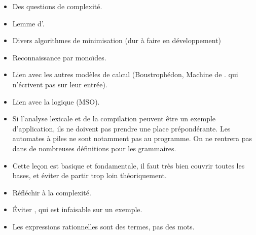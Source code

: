 \documentclass{agregfiche}
\begin{document}
\secidees
\begin{itemize}
	\item Des questions de complexité.
    \item Lemme d'.
	\item Divers algorithmes de minimisation (dur à faire en développement)
	\item Reconnaissance par monoïdes.
	\item Lien avec les autres modèles de calcul (Boustrophédon, Machine de .
	qui n'écrivent pas sur leur entrée).
	\item Lien avec la logique (MSO).
\end{itemize}


\secpieges

\begin{itemize}
\item Si l'analyse lexicale et de la compilation peuvent être un exemple d'application, ils ne doivent pas prendre une place prépondérante. Les automates à piles ne sont notamment pas au programme. On ne rentrera pas dans de nombreuses définitions pour les grammaires.
\item Cette leçon est basique et fondamentale, il faut très bien couvrir toutes les bases, et éviter de partir trop loin théoriquement.
\item Réfléchir à la complexité.
\item Éviter  , qui est infaisable sur un exemple.
\item Les expressions rationnelles sont des termes, pas des mots.
\end{itemize}
\end{document}
